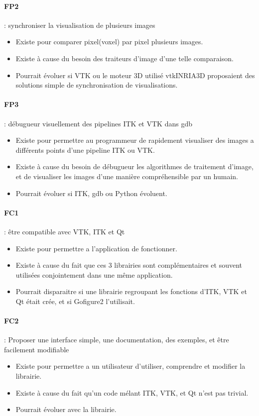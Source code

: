 \paragraph*{FP2} : synchroniser la visualisation de plusieurs images
\begin{itemize}
  \item Existe pour comparer pixel(voxel) par pixel plusieurs images.
  \item Existe à cause du besoin des traiteurs d'image d'une telle comparaison.
  \item Pourrait évoluer si VTK ou le moteur 3D utilisé vtkINRIA3D\cite{vtkINRIA}
  proposaient des solutions simple de synchronisation de visualisations.
\end{itemize}

\paragraph*{FP3} : débugueur visuellement des pipelines ITK et VTK dans gdb
\begin{itemize}
  \item Existe pour permettre au programmeur de rapidement visualiser des images a différents points d'une pipeline ITK ou VTK.
  \item Existe à cause du besoin de débugueur les algorithmes de traitement d'image,
  et de visualiser les images d'une manière compréhensible par un humain.
  \item Pourrait évoluer si ITK, gdb ou Python évoluent.
\end{itemize}

\paragraph*{FC1} : être compatible avec VTK, ITK et Qt
\begin{itemize}
  \item Existe pour permettre a l'application de fonctionner.
  \item Existe à cause du fait que ces 3 librairies sont complémentaires et souvent utilisées conjointement dans une même application.
  \item Pourrait disparaitre si une librairie regroupant les fonctions d'ITK, VTK et Qt était crée, et si Gofigure2 l'utilisait.
\end{itemize}

\paragraph*{FC2} : Proposer une interface simple, une documentation, des exemples, et être facilement modifiable
\begin{itemize}
  \item Existe pour permettre a un utilisateur d'utiliser, comprendre et modifier la librairie.
  \item Existe à cause du fait qu'un code mélant ITK, VTK, et Qt n'est pas trivial.
  \item Pourrait évoluer avec la librairie.
\end{itemize}

